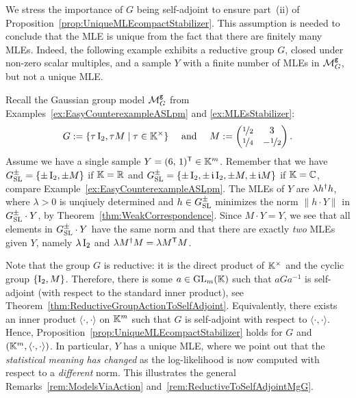 We stress the importance of $G$ being self-adjoint to ensure part~(ii) of Proposition~\ref{prop:UniqueMLEcompactStabilizer}. This assumption is needed to conclude that the MLE is unique from the fact that there are finitely many MLEs. Indeed, the following example exhibits a reductive group $G$, closed under non-zero scalar multiples, and a sample $Y$ with a finite number of MLEs in $\mathcal{M}^{\mathtt{g}}_G$, but not a unique MLE.

\begin{example}\label{ex:AKRS-Example3-12}
	Recall the Gaussian group model $\mathcal{M}^{\mathtt{g}}_G$ from Examples~\ref{ex:EasyCounterexampleASLpm} and \ref{ex:MLEsStabilizer}:
	\[G := \{ \tau \operatorname{I}_2,  \tau M \mid \tau \in \mathbb K^{\times} \} \quad \text{ and } \quad M := \begin{pmatrix}
		\nicefrac{1}{2} & 3 \\ \nicefrac{1}{4} & - \nicefrac{1}{2}
	\end{pmatrix}. \]
	Assume we have a single sample $Y = (6, \, 1)^{\mathsf{T}} \in \mathbb K^m$. Remember that we have $G_{\operatorname{SL}}^{\pm} = \{\pm \operatorname{I}_2, \pm M\}$ if $\mathbb K=\mathbb R$ and $G_{\operatorname{SL}}^{\pm} = \{\pm \operatorname{I}_2, \pm \,\mathfrak{i} \operatorname{I}_2, \pm M, \pm \,\mathfrak{i} M\}$ if $\mathbb K = \mathbb C$, compare Example~\ref{ex:EasyCounterexampleASLpm}.
	The MLEs of $Y$ are $\lambda h^{\dagger} h$, where $\lambda > 0$ is unqiuely determined and $h \in G_{\operatorname{SL}}^\pm$ minimizes the norm $\|h \cdot Y\|$ in $G_{\operatorname{SL}}^{\pm} \cdot Y$, by Theorem~\ref{thm:WeakCorrespondence}. Since $M \cdot Y = Y$, we see that all elements in $G_{\operatorname{SL}}^{\pm} \cdot Y$ have the same norm and that there are exactly \emph{two} MLEs given $Y$, namely $\lambda \operatorname{I}_2$ and $\lambda M^{\dagger} M = \lambda M^{\mathsf{T}} M$.
	
	Note that the group $G$ is reductive: it is the direct product of $\mathbb K^\times$ and the cyclic group $\{ \operatorname{I}_2, M\}$. Therefore, there is some $a \in \operatorname{GL}_m(\mathbb K)$ such that $a G a^{-1}$ is self-adjoint (with respect to the standard inner product), see Theorem~\ref{thm:ReductiveGroupActionToSelfAdjoint}.
	Equivalently, there exists an inner product $\langle \cdot, \cdot \rangle$ on $\mathbb K^m$ such that $G$ is self-adjoint with respect to $\langle \cdot, \cdot \rangle$. Hence, Proposition~\ref{prop:UniqueMLEcompactStabilizer} holds for $G$ and $(\mathbb K^m, \langle \cdot, \cdot \rangle)$. In particular, $Y$ has a unique MLE, %
	where we point out that the \emph{statistical meaning has changed} as the log-likelihood is now computed with respect to a \emph{different} norm. %
	This illustrates the general Remarks~\ref{rem:ModelsViaAction} and~\ref{rem:ReductiveToSelfAdjointMgG}.
	\hfill\exSymbol
\end{example}

